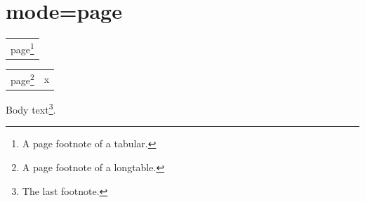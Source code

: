 \documentclass{article}
\begin{document}
\section{mode=page}

\begin{tabular}{l}
page\footnote{A page footnote of a tabular.} \\
\end{tabular}

\begin{longtable}{ll}
page\footnote{A page footnote of a longtable.} & x \\
\end{longtable}

Body text\footnote{The last footnote.}.
\end{document}
